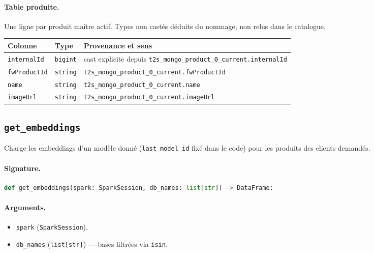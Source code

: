 \documentclass[11pt,a4paper]{article}
\newcommand{\code}[1]{\texttt{\small #1}}
\begin{document}
\paragraph{Table produite.}
Une ligne par produit maître actif. Types non castés déduits du nommage, non relus
dans le catalogue.
\begin{center}
\small
\begin{tabular}{@{}llp{6.8cm}@{}}
\toprule
\textbf{Colonne} & \textbf{Type} & \textbf{Provenance et sens} \\
\midrule
\code{internalId} & \code{bigint} & cast explicite depuis \code{t2s\_mongo\_product\_0\_current.internalId} \\
\code{fwProductId} & \code{string} & \code{t2s\_mongo\_product\_0\_current.fwProductId} \\
\code{name} & \code{string} & \code{t2s\_mongo\_product\_0\_current.name} \\
\code{imageUrl} & \code{string} & \code{t2s\_mongo\_product\_0\_current.imageUrl} \\
\bottomrule
\end{tabular}
\end{center}

\subsection{\texttt{get\_embeddings}}
\label{subsec:fn-get-embeddings}

Charge les embeddings d'un modèle donné (\code{last\_model\_id} fixé dans le code)
pour les produits des clients demandés.

\paragraph{Signature.}\leavevmode\par
\begin{lstlisting}[language=Python]
def get_embeddings(spark: SparkSession, db_names: list[str]) -> DataFrame:
\end{lstlisting}

\paragraph{Arguments.}
\begin{itemize}[nosep,leftmargin=*]
  \item \code{spark} (\code{SparkSession}).
  \item \code{db\_names} (\code{list[str]}) --- bases filtrées via \code{isin}.
\end{itemize}
\end{document}
